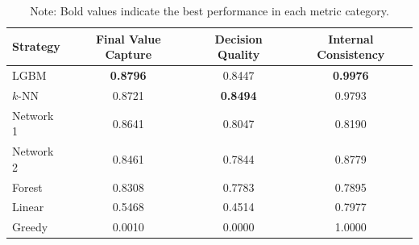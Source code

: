 \documentclass[11pt,reqno,a4paper]{amsart}
\theoremstyle{definition}
\numberwithin{equation}{section}
\DeclareMathOperator{\1}{\mathbbm{1}}
\begin{document}
\begin{table}[htbp]
  \centering
  \caption{Performance Metrics of Different Strategies, BSP Experiment}
  \label{tab:strategy_metrics_2}
  \begin{tabular}{lccc}
    \toprule
    \textbf{Strategy} & \textbf{Final Value Capture} & \textbf{Decision Quality} & \textbf{Internal Consistency} \\
    \midrule
    LGBM              & \textbf{0.8796}              & 0.8447                    & \textbf{0.9976}               \\
    $k$-NN            & 0.8721                       & \textbf{0.8494}           & 0.9793                        \\
    Network 1         & 0.8641                       & 0.8047                    & 0.8190                        \\
    Network 2         & 0.8461                       & 0.7844                    & 0.8779                        \\
    Forest            & 0.8308                       & 0.7783                    & 0.7895                        \\
    Linear            & 0.5468                       & 0.4514                    & 0.7977                        \\
    Greedy            & 0.0010                       & 0.0000                    & 1.0000                        \\
    \bottomrule
  \end{tabular}
  \caption*{\small Note: Bold values indicate the best performance in each metric category.}
\end{table}
\end{document}

